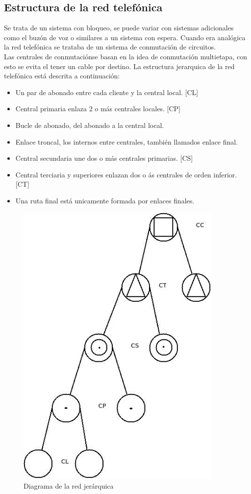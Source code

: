 \subsection{Estructura de la red telefónica}
Se trata de un sistema con bloqueo, se puede variar con sistemas adicionales como el buzón de voz o similares a un sistema con espera. Cuando era analógica la red telefónica se trataba de un sistema de conmutación de circuitos.\\
Las centrales de conmutaciónse basan en la idea de conmutación multietapa, con esto se evita el tener un cable por destino. La estructura jerarquica de la red telefónica está descrita a continuación:
\begin{itemize}
\item Un par de abonado entre cada cliente y la central local. [CL]
\item Central primaria enlaza 2 o más centrales locales. [CP]
\item Bucle de abonado, del abonado a la central local.
\item Enlace troncal, los internos entre centrales, también llamados enlace final.
\item Central secundaria une dos o más centrales primarias. [CS]
\item Central terciaria y superiores enlazan dos o ás centrales de orden inferior. [CT]
\item Una ruta final está unicamente formada por enlaces finales.
\end{itemize}
\begin{figure}[H]
\centering
\includegraphics[width=0.9\textwidth]{Imagen/diajerartelefono.jpg}
\caption{Diagrama de la red jerárquica}
\label{diaRedTelefonica}
\end{figure}

